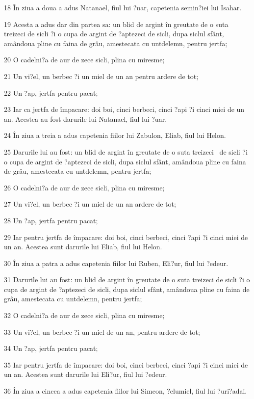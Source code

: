 \par 18 În ziua a doua a adus Natanael, fiul lui ?uar, capetenia semin?iei lui Isahar.
\par 19 Acesta a adus dar din partea sa: un blid de argint în greutate de o suta treizeci de sicli ?i o cupa de argint de ?aptezeci de sicli, dupa siclul sfânt, amândoua pline cu faina de grâu, amestecata cu untdelemn, pentru jertfa;
\par 20 O cadelni?a de aur de zece sicli, plina cu miresme;
\par 21 Un vi?el, un berbec ?i un miel de un an pentru ardere de tot;
\par 22 Un ?ap, jertfa pentru pacat;
\par 23 Iar ca jertfa de împacare: doi boi, cinci berbeci, cinci ?api ?i cinci miei de un an. Acestea au fost darurile lui Natanael, fiul lui ?uar.
\par 24 În ziua a treia a adus capetenia fiilor lui Zabulon, Eliab, fiul lui Helon.
\par 25 Darurile lui au fost: un blid de argint în greutate de o suta treizeci  de sicli ?i o cupa de argint de ?aptezeci de sicli, dupa siclul sfânt, amândoua pline cu faina de grâu, amestecata cu untdelemn, pentru jertfa;
\par 26 O cadelni?a de aur de zece sicli, plina cu miresme;
\par 27 Un vi?el, un berbec ?i un miel de un an ardere de tot;
\par 28 Un ?ap, jertfa pentru pacat;
\par 29 Iar pentru jertfa de împacare: doi boi, cinci berbeci, cinci ?api ?i cinci miei de un an. Acestea sunt darurile lui Eliab, fiul lui Helon.
\par 30 În ziua a patra a adus capetenia fiilor lui Ruben, Eli?ur, fiul lui ?edeur.
\par 31 Darurile lui au fost: un blid de argint în greutate de o suta treizeci de sicli ?i o cupa de argint de ?aptezeci de sicli, dupa siclul sfânt, amândoua pline cu faina de grâu, amestecata cu untdelemn, pentru jertfa;
\par 32 O cadelni?a de aur de zece sicli, plina cu miresme;
\par 33 Un vi?el, un berbec ?i un miel de un an, pentru ardere de tot;
\par 34 Un ?ap, jertfa pentru pacat;
\par 35 Iar pentru jertfa de împacare: doi boi, cinci berbeci, cinci ?api ?i cinci miei de un an. Acestea sunt darurile lui Eli?ur, fiul lui ?edeur.
\par 36 În ziua a cincea a adus capetenia fiilor lui Simeon, ?elumiel, fiul lui ?uri?adai.
